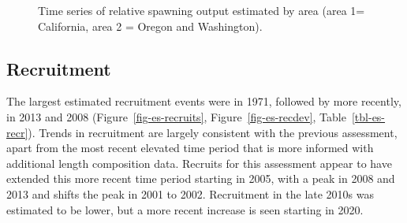 \documentclass[
]{scrartcl}
\begin{document}
\begin{figure}


\caption{\label{fig-status-area-es}Time series of relative spawning
output estimated by area (area 1= California, area 2 = Oregon and
Washington).}

\end{figure}%

\subsection*{Recruitment}\label{recruitment}

The largest estimated recruitment events were in 1971, followed by more
recently, in 2013 and 2008 (Figure~\ref{fig-es-recruits},
Figure~\ref{fig-es-recdev}, Table~\ref{tbl-es-recr}). Trends in
recruitment are largely consistent with the previous assessment, apart
from the most recent elevated time period that is more informed with
additional length composition data. Recruits for this assessment appear
to have extended this more recent time period starting in 2005, with a
peak in 2008 and 2013 and shifts the peak in 2001 to 2002. Recruitment
in the late 2010s was estimated to be lower, but a more recent increase
is seen starting in 2020.

\begingroup
\fontsize{9.0pt}{10.8pt}\selectfont
\end{document}
